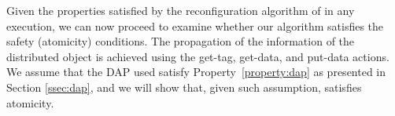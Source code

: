 

Given the properties satisfied by the reconfiguration algorithm of \ares{} 
in any execution, we can now proceed to examine whether our algorithm satisfies the safety (atomicity) conditions. The
propagation of the information of the distributed object is achieved using the get-tag, get-data, and
put-data actions. We assume that the DAP used satisfy  Property~\ref{property:dap} as presented in
Section \ref{ssec:dap}, and we will show that, given such assumption, \ares{} satisfies atomicity.

